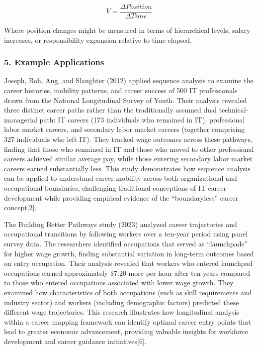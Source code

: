 \documentclass[./main.tex]{subfiles}
\begin{document}
\[ V = \frac{\Delta Position}{\Delta Time} \]

Where position changes might be measured in terms of hierarchical
levels, salary increases, or responsibility expansion relative to time
elapsed.

\subsubsection{5. Example Applications}\label{example-applications}

Joseph, Boh, Ang, and Slaughter (2012) applied sequence analysis to
examine the career histories, mobility patterns, and career success of
500 IT professionals drawn from the National Longitudinal Survey of
Youth. Their analysis revealed three distinct career paths rather than
the traditionally assumed dual technical-managerial path: IT careers
(173 individuals who remained in IT), professional labor market careers,
and secondary labor market careers (together comprising 327 individuals
who left IT). They tracked wage outcomes across these pathways, finding
that those who remained in IT and those who moved to other professional
careers achieved similar average pay, while those entering secondary
labor market careers earned substantially less. This study demonstrates
how sequence analysis can be applied to understand career mobility
across both organizational and occupational boundaries, challenging
traditional conceptions of IT career development while providing
empirical evidence of the ``boundaryless'' career concept{[}2{]}.

The Building Better Pathways study (2023) analyzed career trajectories
and occupational transitions by following workers over a ten-year period
using panel survey data. The researchers identified occupations that
served as ``launchpads'' for higher wage growth, finding substantial
variation in long-term outcomes based on entry occupation. Their
analysis revealed that workers who entered launchpad occupations earned
approximately \$7.20 more per hour after ten years compared to those who
entered occupations associated with lower wage growth. They examined how
characteristics of both occupations (such as skill requirements and
industry sector) and workers (including demographic factors) predicted
these different wage trajectories. This research illustrates how
longitudinal analysis within a career mapping framework can identify
optimal career entry points that lead to greater economic advancement,
providing valuable insights for workforce development and career
guidance initiatives{[}6{]}.
\end{document}
